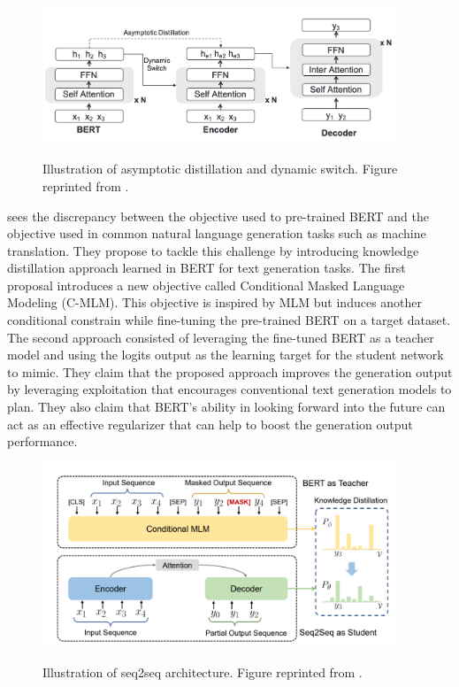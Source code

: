 \begin{figure}[h]
    {\includegraphics[width=0.95\textwidth]{img/ctnmt.png}}
    \centering
    \caption{Illustration of asymptotic distillation and dynamic switch. Figure reprinted from \cite{yang2020towards}.}
    \label{img:ctnmt}
\end{figure}

\cite{chen2019distilling} sees the discrepancy between the objective used to pre-trained BERT and the objective used in common natural language generation tasks such as machine translation. They propose to tackle this challenge by introducing knowledge distillation approach learned in BERT for text generation tasks. The first proposal introduces a new objective called Conditional Masked Language Modeling (C-MLM). This objective is inspired by MLM but induces another conditional constrain while fine-tuning the pre-trained BERT on a target dataset. The second approach consisted of leveraging the fine-tuned BERT as a teacher model and using the logits output as the learning target for the student network to mimic. They claim that the proposed approach improves the generation output by leveraging exploitation that encourages conventional text generation models to plan. They also claim that BERT's ability in looking forward into the future can act as an effective regularizer that can help to boost the generation output performance.

\begin{figure}[h]
    {\includegraphics[width=0.95\textwidth]{img/bert_distill.png}}
    \centering
    \caption{Illustration of seq2seq architecture. Figure reprinted from \cite{chen2019distilling}.}
    \label{img:bert_distill}
\end{figure}

